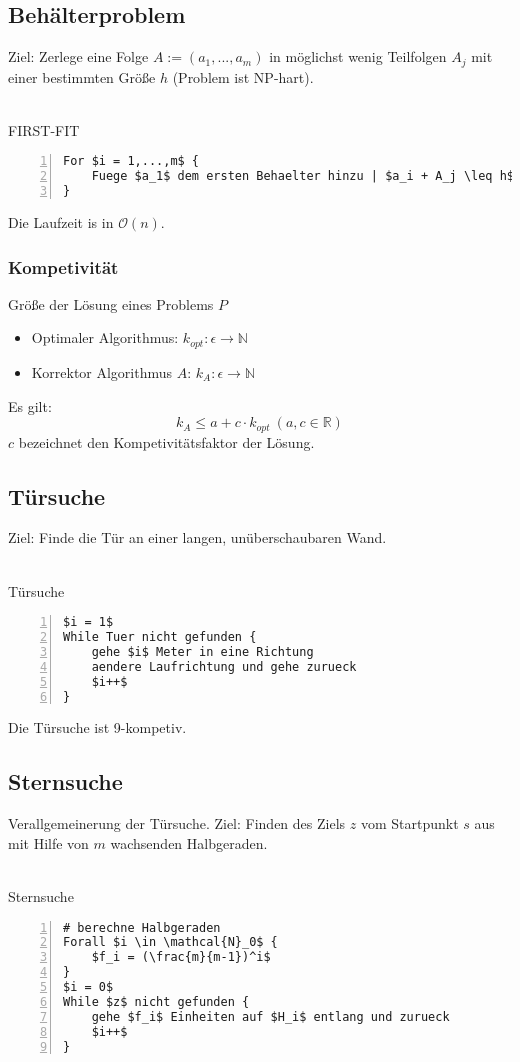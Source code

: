\subsection{Behälterproblem}
Ziel: Zerlege eine Folge \(A := (a_1,...,a_m)\) in möglichst wenig Teilfolgen \(A_j\) mit einer bestimmten Größe \(h\) (Problem ist NP-hart).
\\\\
\begin{minipage}{\textwidth}
FIRST-FIT
\begin{lstlisting}[frame=single,numbers=left,mathescape]
For $i = 1,...,m$ {
	Fuege $a_1$ dem ersten Behaelter hinzu | $a_i + A_j \leq h$
}
\end{lstlisting}
\end{minipage}
Die Laufzeit is in \(\mathcal{O}(n)\).

\subsubsection{Kompetivität}
Größe der Lösung eines Problems \(P\)
\begin{itemize}
	\item Optimaler Algorithmus: \(k_{opt}: \epsilon \rightarrow \mathbb{N}\)
	\item Korrektor Algorithmus \(A\): \(k_A: \epsilon \rightarrow \mathbb{N}\)
\end{itemize}
Es gilt:
\[k_A \leq a+c\cdot k_{opt}~(a,c \in \mathbb{R})\]
\(c\) bezeichnet den Kompetivitätsfaktor der Lösung.


\subsection{Türsuche}
Ziel: Finde die Tür an einer langen, unüberschaubaren Wand.
\\\\
\begin{minipage}{\textwidth}
Türsuche
\begin{lstlisting}[frame=single,numbers=left,mathescape]
$i = 1$
While Tuer nicht gefunden {
	gehe $i$ Meter in eine Richtung
	aendere Laufrichtung und gehe zurueck
	$i++$
}
\end{lstlisting}
\end{minipage}
Die Türsuche ist 9-kompetiv.


\subsection{Sternsuche}
Verallgemeinerung der Türsuche. Ziel: Finden des Ziels \(z\) vom Startpunkt \(s\) aus mit Hilfe von \(m\) wachsenden Halbgeraden.
\\\\
\begin{minipage}{\textwidth}
Sternsuche
\begin{lstlisting}[frame=single,numbers=left,mathescape]
# berechne Halbgeraden
Forall $i \in \mathcal{N}_0$ {
	$f_i = (\frac{m}{m-1})^i$
}
$i = 0$
While $z$ nicht gefunden {
	gehe $f_i$ Einheiten auf $H_i$ entlang und zurueck
	$i++$
}
\end{lstlisting}
\end{minipage}


